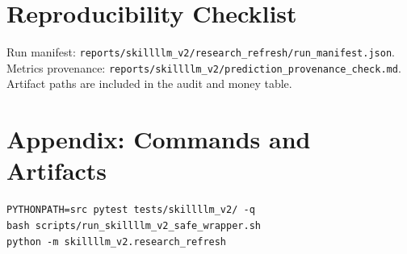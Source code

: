 \documentclass[11pt]{article}
\begin{document}
\section{Reproducibility Checklist}
Run manifest: \texttt{reports/skillllm\_v2/research\_refresh/run\_manifest.json}. Metrics provenance: \texttt{reports/skillllm\_v2/prediction\_provenance\_check.md}. Artifact paths are included in the audit and money table.

\section{Appendix: Commands and Artifacts}
\begin{verbatim}
PYTHONPATH=src pytest tests/skillllm_v2/ -q
bash scripts/run_skillllm_v2_safe_wrapper.sh
python -m skillllm_v2.research_refresh
\end{verbatim}



\end{document}
